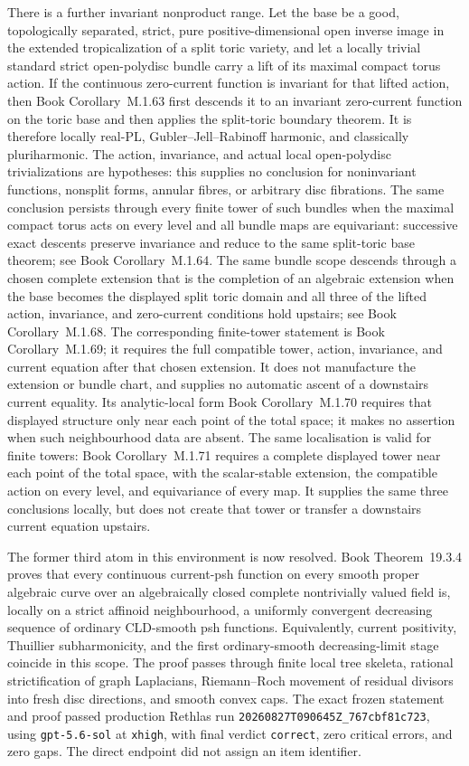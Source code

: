 \documentclass[11pt,a4paper]{article}
\theoremstyle{definition}
\theoremstyle{remark}
\begin{document}
There is a further invariant nonproduct range.  Let the base be a good,
topologically separated, strict, pure positive-dimensional open inverse
image in the extended tropicalization of a split toric variety, and let a
locally trivial standard strict open-polydisc bundle carry a lift of its
maximal compact torus action.  If the continuous zero-current function is
invariant for that lifted action, then
Book Corollary~M.1.63 first descends it to
an invariant zero-current function on the toric base and then applies the
split-toric boundary theorem.  It is therefore locally real-PL,
Gubler--Jell--Rabinoff harmonic, and classically pluriharmonic.  The action,
invariance, and actual local open-polydisc trivializations are hypotheses:
this supplies no conclusion for noninvariant functions, nonsplit forms,
annular fibres, or arbitrary disc fibrations.
The same conclusion persists through every finite tower of such bundles
when the maximal compact torus acts on every level and all bundle maps are
equivariant: successive exact descents preserve invariance and reduce to
the same split-toric base theorem; see
Book Corollary~M.1.64.
The same bundle scope descends through a chosen complete extension that is
the completion of an algebraic extension when the base becomes the displayed
split toric domain and all three of the lifted action, invariance, and
zero-current conditions hold upstairs; see
Book Corollary~M.1.68.
The corresponding finite-tower statement is
Book Corollary~M.1.69;
it requires the full compatible tower, action, invariance, and current
equation after that chosen extension.
It does not manufacture the extension or bundle chart, and supplies no
automatic ascent of a downstairs current equality.
Its analytic-local form
Book Corollary~M.1.70
requires that displayed structure only near each point of the total space;
it makes no assertion when such neighbourhood data are absent.
The same localisation is valid for finite towers:
Book Corollary~M.1.71
requires a complete displayed tower near each point of the total space, with
the scalar-stable extension, the compatible action on every level, and
equivariance of every map.  It supplies the same three conclusions locally,
but does not create that tower or transfer a downstairs current equation
upstairs.

The former third atom in this environment is now resolved.
Book Theorem~19.3.4 proves that every
continuous current-psh function on every smooth proper algebraic curve over
an algebraically closed complete nontrivially valued field is, locally on a
strict affinoid neighbourhood, a uniformly convergent decreasing sequence of
ordinary CLD-smooth psh functions.  Equivalently, current positivity,
Thuillier subharmonicity, and the first ordinary-smooth decreasing-limit
stage coincide in this scope.  The proof passes through finite local tree
skeleta, rational strictification of graph Laplacians, Riemann--Roch movement
of residual divisors into fresh disc directions, and smooth convex caps.
The exact frozen statement and proof passed production Rethlas run
\nolinkurl{20260827T090645Z_767cbf81c723}, using
\texttt{gpt-5.6-sol} at \texttt{xhigh}, with final verdict
\texttt{correct}, zero critical errors, and zero gaps.  The direct endpoint
did not assign an item identifier.
\end{document}
